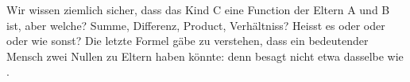 Wir wissen ziemlich sicher, dass das Kind C eine Function der Eltern A und B ist, aber welche? Summe, Differenz, Product, Verhältniss? Heisst es  oder  oder  oder wie sonst? Die letzte Formel gäbe zu verstehen, dass ein bedeutender Mensch zwei Nullen zu Eltern haben könnte: denn  besagt nicht etwa dasselbe wie .
\par

